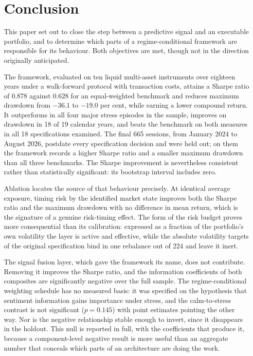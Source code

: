 \section{Conclusion}
\label{sec:conclusion}

This paper set out to close the step between a predictive signal and an executable
portfolio, and to determine which parts of a regime-conditional framework are
responsible for its behaviour. Both objectives are met, though not in the direction
originally anticipated.

The framework, evaluated on ten liquid multi-asset instruments over eighteen years under
a walk-forward protocol with transaction costs, attains a Sharpe ratio of 0.878 against
0.628 for an equal-weighted benchmark and reduces maximum drawdown from $-36.1$ to
$-19.0$ per cent, while earning a lower compound return. It outperforms in all four
major stress episodes in the sample, improves on drawdown in 18 of 19 calendar years,
and beats the benchmark on both measures in all 18 specifications examined. The final
665 sessions, from January 2024 to August 2026, postdate every specification decision
and were held out; on them the framework records a higher Sharpe ratio and a smaller
maximum drawdown than all three benchmarks. The Sharpe improvement is nevertheless
consistent rather than statistically significant: its bootstrap interval includes
zero.

Ablation locates the source of that behaviour precisely. At identical average exposure,
timing risk by the identified market state improves both the Sharpe ratio and the
maximum drawdown with no difference in mean return, which is the signature of a genuine
risk-timing effect. The form of the risk budget proves more consequential than its
calibration: expressed as a fraction of the portfolio's own volatility the layer is
active and effective, while the absolute volatility targets of the original
specification bind in one rebalance out of 224 and leave it inert.

The signal fusion layer, which gave the framework its name, does not contribute.
Removing it improves the Sharpe ratio, and the information coefficients of both
composites are significantly negative over the full sample. The regime-conditional
weighting schedule has no measured basis: it was specified on the hypothesis that
sentiment information gains importance under stress, and the calm-to-stress contrast
is not significant ($p = 0.145$) with point estimates pointing the other way. Nor is the
negative relationship stable enough to invert, since it disappears in the holdout. This
null is reported in full,
with the coefficients that produce it, because a component-level negative result is more
useful than an aggregate number that conceals which parts of an architecture are doing
the work.


